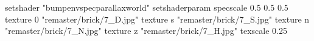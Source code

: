 setshader "bumpenvspecparallaxworld"
setshaderparam specscale 0.5 0.5 0.5
    texture 0 "remaster/brick/7_D.jpg"
    texture s "remaster/brick/7_S.jpg"
    texture n "remaster/brick/7_N.jpg"
    texture z "remaster/brick/7_H.jpg"
    texscale 0.25